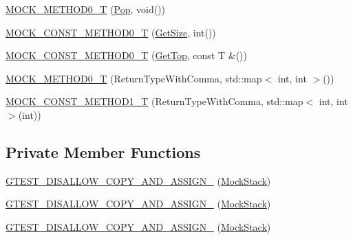\begin{DoxyCompactItemize}
\item 
\mbox{\hyperlink{classtesting_1_1gmock__generated__function__mockers__test_1_1_mock_stack_a5e55ffb22e7f11c6940a97bd001bd50c}{M\+O\+C\+K\+\_\+\+M\+E\+T\+H\+O\+D0\+\_\+T}} (\mbox{\hyperlink{classtesting_1_1gmock__generated__function__mockers__test_1_1_stack_interface_a1a6646d1d9febe90c607b9b3e4539b67}{Pop}}, void())
\item 
\mbox{\hyperlink{classtesting_1_1gmock__generated__function__mockers__test_1_1_mock_stack_a6171be20e8e4f44464cc8968e05b7c7a}{M\+O\+C\+K\+\_\+\+C\+O\+N\+S\+T\+\_\+\+M\+E\+T\+H\+O\+D0\+\_\+T}} (\mbox{\hyperlink{classtesting_1_1gmock__generated__function__mockers__test_1_1_stack_interface_a537ec8647a2333f50e5f923a85b90eba}{Get\+Size}}, int())
\item 
\mbox{\hyperlink{classtesting_1_1gmock__generated__function__mockers__test_1_1_mock_stack_ae5950cfac08382a0ffc7c3bd5aba405f}{M\+O\+C\+K\+\_\+\+C\+O\+N\+S\+T\+\_\+\+M\+E\+T\+H\+O\+D0\+\_\+T}} (\mbox{\hyperlink{classtesting_1_1gmock__generated__function__mockers__test_1_1_stack_interface_af36e32b9ae568100363466d1ebf95364}{Get\+Top}}, const T \&())
\item 
\mbox{\hyperlink{classtesting_1_1gmock__generated__function__mockers__test_1_1_mock_stack_a4b67d1f5b795e7c072fb846217a8f130}{M\+O\+C\+K\+\_\+\+M\+E\+T\+H\+O\+D0\+\_\+T}} (Return\+Type\+With\+Comma, std\+::map$<$ int, int $>$())
\item 
\mbox{\hyperlink{classtesting_1_1gmock__generated__function__mockers__test_1_1_mock_stack_a69b9a7d0231b729d8a47201a49fa9166}{M\+O\+C\+K\+\_\+\+C\+O\+N\+S\+T\+\_\+\+M\+E\+T\+H\+O\+D1\+\_\+T}} (Return\+Type\+With\+Comma, std\+::map$<$ int, int $>$(int))
\end{DoxyCompactItemize}
\subsection*{Private Member Functions}
\begin{DoxyCompactItemize}
\item 
\mbox{\hyperlink{classtesting_1_1gmock__generated__function__mockers__test_1_1_mock_stack_a769b47c7a69cbf6b1aab29e40005c234}{G\+T\+E\+S\+T\+\_\+\+D\+I\+S\+A\+L\+L\+O\+W\+\_\+\+C\+O\+P\+Y\+\_\+\+A\+N\+D\+\_\+\+A\+S\+S\+I\+G\+N\+\_\+}} (\mbox{\hyperlink{classtesting_1_1gmock__generated__function__mockers__test_1_1_mock_stack}{Mock\+Stack}})
\item 
\mbox{\hyperlink{classtesting_1_1gmock__generated__function__mockers__test_1_1_mock_stack_a769b47c7a69cbf6b1aab29e40005c234}{G\+T\+E\+S\+T\+\_\+\+D\+I\+S\+A\+L\+L\+O\+W\+\_\+\+C\+O\+P\+Y\+\_\+\+A\+N\+D\+\_\+\+A\+S\+S\+I\+G\+N\+\_\+}} (\mbox{\hyperlink{classtesting_1_1gmock__generated__function__mockers__test_1_1_mock_stack}{Mock\+Stack}})
\item 
\mbox{\hyperlink{classtesting_1_1gmock__generated__function__mockers__test_1_1_mock_stack_a769b47c7a69cbf6b1aab29e40005c234}{G\+T\+E\+S\+T\+\_\+\+D\+I\+S\+A\+L\+L\+O\+W\+\_\+\+C\+O\+P\+Y\+\_\+\+A\+N\+D\+\_\+\+A\+S\+S\+I\+G\+N\+\_\+}} (\mbox{\hyperlink{classtesting_1_1gmock__generated__function__mockers__test_1_1_mock_stack}{Mock\+Stack}})
\end{DoxyCompactItemize}


